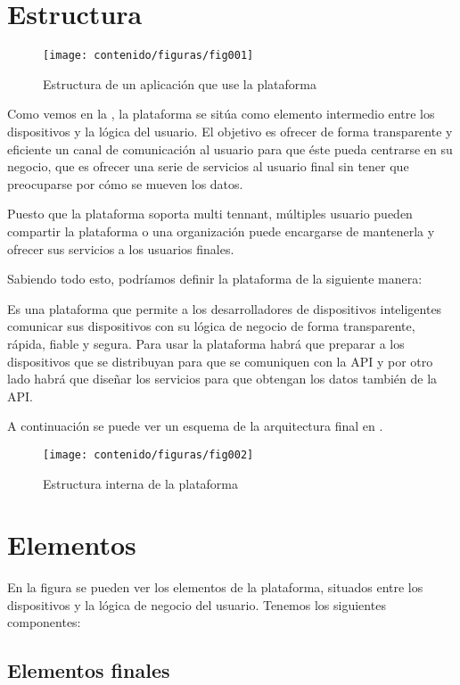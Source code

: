 \section{Estructura}

\begin{figure}[htbp]
\centering
\texttt{[image: contenido/figuras/fig001]}
\caption{Estructura de un aplicación que use la plataforma}
\label{fig:figura1}
\end{figure}

Como vemos en la , la plataforma se sitúa como elemento intermedio entre
los dispositivos y la lógica del usuario. El objetivo es ofrecer de forma
transparente y eficiente un canal de comunicación al usuario para que éste pueda
centrarse en su negocio, que es ofrecer una serie de servicios al usuario final
sin tener que preocuparse por cómo se mueven los datos.

Puesto que la plataforma soporta multi tennant, múltiples usuario pueden
compartir la plataforma o una organización puede encargarse de mantenerla y
ofrecer sus servicios a los usuarios finales.

Sabiendo todo esto, podríamos definir la plataforma de la siguiente manera:

Es una plataforma que permite a los desarrolladores de dispositivos inteligentes
comunicar sus dispositivos con su lógica de negocio de forma transparente,
rápida, fiable y segura.
Para usar la plataforma habrá que preparar a los dispositivos que se distribuyan
para que se comuniquen con la API y por otro lado habrá que diseñar los
servicios para que obtengan los datos también de la API.

A continuación se puede ver un esquema de la arquitectura final en .

\begin{figure}[htbp]
\centering
\texttt{[image: contenido/figuras/fig002]}
\caption{Estructura interna de la plataforma}
\label{fig:figura2}
\end{figure}

\section{Elementos}

En la figura se pueden ver los elementos de la plataforma, situados entre los
dispositivos y la lógica de negocio del usuario. Tenemos los siguientes
componentes:

\subsection{Elementos finales}

